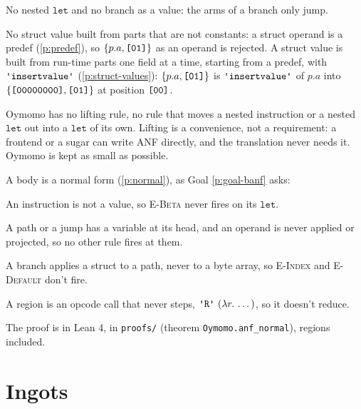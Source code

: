 \documentclass[11pt,letterpaper]{article}
\newcommand{\lam}[2]{\lambda #1.\,#2}       %
\newcommand{\rn}[1]{\textsc{#1}}                %
\newcommand{\kw}[1]{\mathtt{#1}}
\newcommand{\str}[1]{\text{\ttfamily\textquotesingle #1\textquotesingle}}  %
\newcommand{\hex}[1]{\text{\ttfamily [#1]}}  %
\newcounter{pt}
\newcommand{\pref}[1]{\ref{#1}}  %
\begin{document}
\begin{points}
\begin{subpoints}
  \item No nested $\kw{let}$ and no branch as a value: the arms of a branch only jump.
  \item No struct value built from parts that are not constants: a struct operand is a predef (\pref{p:predef}), so $\{p.a, \hex{01}\}$ as an operand is rejected. A struct value is built from run-time parts one
    field at a time, starting from a predef, with $\str{insertvalue}$ (\pref{p:struct-values}):
    $\{p.a, \hex{01}\}$ is $\str{insertvalue}$ of $p.a$ into $\{\hex{00000000}, \hex{01}\}$ at position $\hex{00}$.
  \item Oymomo has no lifting rule, no rule that moves a nested instruction or a nested $\kw{let}$ out into
    a $\kw{let}$ of its own. Lifting is a convenience, not a requirement: a frontend or a sugar can write ANF
    directly, and the translation never needs it. Oymomo is kept as small as possible.
  \end{subpoints}
\item\label{p:anf-normal} A body is a normal form (\pref{p:normal}), as Goal \pref{p:goal-banf} asks:
  \begin{subpoints}
  \item An instruction is not a value, so \rn{E-Beta} never fires on its $\kw{let}$.
  \item A path or a jump has a variable at its head, and an operand is never applied or projected, so no
    other rule fires at them.
  \item A branch applies a struct to a path, never to a byte array, so \rn{E-Index} and \rn{E-Default} don't fire.
  \item A region is an opcode call that never steps, $\str{R}\ (\lam{r}{\dots})$, so it doesn't reduce.
  \item The proof is in Lean 4, in \texttt{proofs/} (theorem \texttt{Oymomo.anf\_normal}), regions included.
  \end{subpoints}
\end{points}


\section{Ingots}\label{sec:modules}
\end{document}
